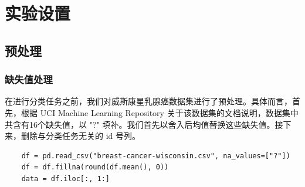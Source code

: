 \documentclass[a4paper,12pt,onecolumn,oneside]{article}
\begin{document}
\section{实验设置}
\vspace{-\baselineskip}
\subsection{预处理}
\subsubsection{缺失值处理}
在进行分类任务之前，我们对威斯康星乳腺癌数据集进行了预处理。具体而言，首先，根据 UCI Machine Learning Repository 关于该数据集的文档说明，数据集中共含有16个缺失值，以 "?" 填补。我们首先以舍入后均值替换这些缺失值。接下来，删除与分类任务无关的 id 号列。
\lstset{language=Python}
\lstset{frame=lines}
\lstset{basicstyle=\footnotesize}
\begin{lstlisting}
	df = pd.read_csv("breast-cancer-wisconsin.csv", na_values=["?"])
	df = df.fillna(round(df.mean(), 0))
	data = df.iloc[:, 1:]
\end{lstlisting}
\end{document}
